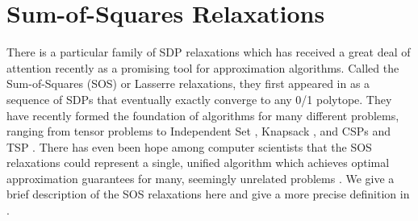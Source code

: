 
\section{Sum-of-Squares Relaxations}
There is a particular family of SDP relaxations which has received a great deal of attention recently as a promising tool for approximation algorithms. Called the Sum-of-Squares (SOS) or Lasserre relaxations, they first appeared in \cite{Shor1987,Parr00,Las01} as a sequence of SDPs that eventually exactly converge to any 0/1 polytope. They have recently formed the foundation of algorithms for many different problems, ranging from tensor problems \cite{TS15,BKS15,HSS15,PS17} to Independent Set \cite{CS08}, Knapsack \cite{KMN10}, and \textsc{CSP}s and \textsc{TSP} \cite{RT12,LRST14}. There has even been hope among computer scientists that the SOS relaxations could represent a single, unified algorithm which achieves optimal approximation guarantees for many, seemingly unrelated problems \cite{BS14}. We give a brief description of the SOS relaxations here and give a more precise definition in .


